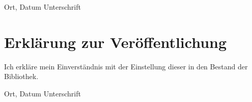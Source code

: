 \documentclass[12pt,final,twoside]{report}
\begin{document}
  \vspace{4cm}
  \noindent Ort, Datum \hfill Unterschrift

  \newpage
  \thispagestyle{empty}
  \hspace{1cm}
  \newpage

  \vspace{2cm}
  \chapter*{Erkl\"arung zur Ver\"offentlichung}
  Ich erkl\"are mein Einverst\"andnis mit der Einstellung dieser \trtype{} in den Bestand der Bibliothek.

  \vspace{4cm}
  \noindent Ort, Datum \hfill Unterschrift

  \newpage
  \thispagestyle{empty}
  \hspace{1cm}
  \newpage

  
\end{document}
